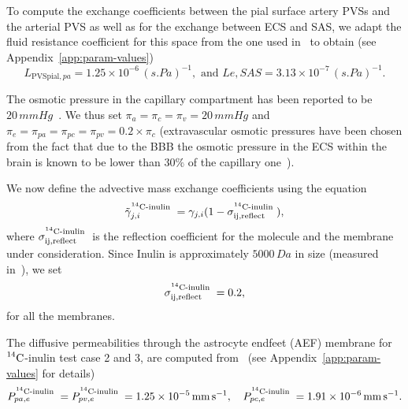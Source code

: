 \documentclass[10pt]{article}
\newcommand{\1}{^{(1)}}
\newcommand{\2}{^{(2)}}
\newcommand{\abs}[1]{\left\lvert#1\right\rvert}
\newcommand{\Cinulin}{$\prescript{14}{}{\text{C}}$-inulin }
\begin{document}
To compute the exchange coefficients between the pial surface artery PVSs and the arterial PVS as well as for the exchange between ECS and SAS, we adapt the fluid resistance coefficient for this space from the one used in~\cite{Vinje-2020-ICP} to obtain (see Appendix~\ref{app:param-values})
\[
    L_{\text{PVSpial},pa} =  1.25 \times 10^{-6} \, \si{(s.Pa)^{-1}},\text{ and }L{e,SAS}  =  3.13\times 10^{-7} \,\si{(s.Pa)^{-1}}.
\]


The osmotic pressure in the capillary compartment has been reported to be $20 \, \si{mmHg}$~\cite{Levick-1991-Capillary}. We thus set $\pi_a = \pi_c = \pi_v = 20 \, \si{mmHg}$ and $\pi_e = \pi_{pa} = \pi_{pc} = \pi_{pv} = 0.2\times \pi_c$ (extravascular osmotic pressures have been chosen from the fact that due to the BBB the osmotic pressure in the ECS within the brain is known to be lower than $30\%$ of the capillary one~\cite{Levick-1991-Capillary}).



We now define the advective mass exchange coefficients using the equation
\[
    \tilde \gamma_{j,i}^{\text{\Cinulin}} = \gamma_{j,i}(1-\sigma^{\text{\Cinulin}}_\text{ij,reflect}),  
\]
where $\sigma^\text{\Cinulin}_\text{ij,reflect}$ is the reflection coefficient for the molecule and the membrane under consideration.
Since Inulin is approximately $5000 \, \si{Da}$ in size (measured in~\cite{trainor1982transcapillary}), we set  
\[
    \sigma^\text{\Cinulin}_\text{ij,reflect} = 0.2,
\]
for all the membranes.

The diffusive permeabilities through the astrocyte endfeet (AEF) membrane for \Cinulin test case 2 and 3, are computed from~\cite{Li-2010-model, Michel-1999-permeablity} (see Appendix~\ref{app:param-values} for details)
\[
    P^{\text{\Cinulin}}_{pa,e} =  P^{\text{\Cinulin}}_{pv,e} =  1.25\times 10^{-5}\, \si{mm.s^{-1}},\quad P^{\text{\Cinulin}}_{pc,e} = 1.91\times 10^{-6} \, \si{mm.s^{-1}}.
\]
\end{document}
